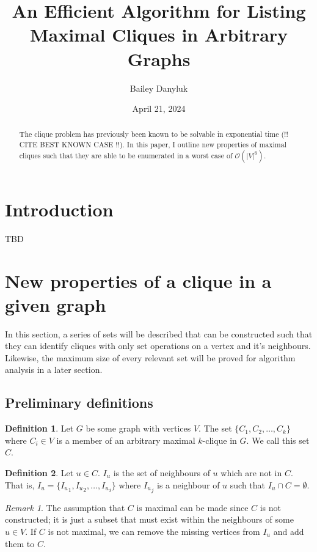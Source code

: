 \documentclass{article}
\title{An Efficient Algorithm for Listing Maximal Cliques in Arbitrary Graphs}
\author{Bailey Danyluk}
\date{April 21, 2024}
\theoremstyle{plain}
\theoremstyle{definition}
\newtheorem{defn}{Definition}[]
\theoremstyle{remark}
\newtheorem*{rem}{Remark}
\newcommand{\bigO}{\mathcal{O}}
\newcommand{\ignv}[1]{ {I_{#1}} }
\begin{document}
\maketitle

\begin{abstract}
The clique problem has previously been known to be solvable in exponential time (!! CITE BEST KNOWN CASE !!). In this
paper, I outline new properties of maximal cliques such that they are able to be
enumerated in a worst case of \(\bigO(|V|^6)\).
\end{abstract}

\section{Introduction}
TBD

\section{New properties of a clique in a given graph}

In this section, a series of sets will be described that can be constructed such that they
can identify cliques with only set operations on a vertex and it's neighbours. Likewise,
the maximum size of every relevant set will be proved for algorithm analysis in a later
section.

\subsection{Preliminary definitions}
\begin{defn}
    Let \(G\) be some graph with vertices \(V\). The set \(\{ C_1, C_2, \dots, C_k \}\)
    where \(C_i \in V\) is a member of an arbitrary maximal \(k\)-clique in \(G\). We call
    this set \(C\).
    \label{clique_def}
\end{defn}

\begin{defn}
    Let \(u \in C\). \(\ignv{u}\) is the set of neighbours of \(u\) which are not in \(C\).
    That is, \(\ignv{u} = \{ \ignv{u}_1, \ignv{u}_2, \dots, \ignv{u}_i \}\) where
    \(\ignv{u}_j\) is a neighbour of \(u\) such that \(\ignv{u} \cap C = \emptyset\).
\end{defn}

\begin{rem}
    The assumption that \(C\) is maximal can be made since \(C\) is not constructed; it is
    just a subset that must exist within the neighbours of some \(u \in V\). If \(C\) is
    not maximal, we can remove the missing vertices from \(\ignv{u}\) and add them to
    \(C\).
\end{rem}
\end{document}
